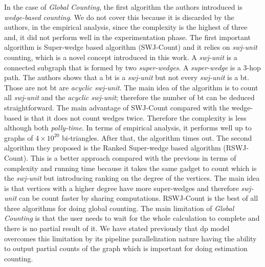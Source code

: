 In the case of \emph{Global Counting}, the first algorithm the authors introduced is \emph{wedge-based counting}. We do not cover this because it is discarded
by the authors, in the empirical analysis, since the complexity is the highest of three and, it did not perform well in the experimentation phase.
The first important algorithm is Super-wedge based algorithm (SWJ-Count) and it relies on \emph{swj-unit} counting, which is a novel concept introduced in this work. A \emph{swj-unit} is a connected subgraph that is formed by two \emph{super-wedges}. A \emph{super-wedge}
is a 3-hop path. The authors shows that a \acrshort{bt} is a \emph{swj-unit} but not every \emph{swj-unit} is a \acrshort{bt}. Those 
are not \acrshort{bt} are \emph{acyclic swj-unit}. The main idea of the algorithm is to count all \emph{swj-unit} and the \emph{acyclic swj-unit}; therefore
the number of \acrshort{bt} can be deduced straightforward.
The main advantage of SWJ-Count compared with the wedge-based is that it does not count wedges twice.
Therefore the complexity is less although both \emph{polly-time}.
In terms of empirical analysis, it performs well up to graphs of $4 \times 10^20$ bi-triangles. After that, the algorithm times out.
The second algorithm they proposed is the Ranked Super-wedge based algorithm (RSWJ-Count). This is a better approach compared with the previous in terms of complexity and running time because it takes the same gadget to count which is the \emph{swj-unit} but introducing ranking on the degree of the vertices. The main idea is that vertices with a higher degree have more super-wedges 
and therefore \emph{swj-unit} can be count faster by sharing computations. RSWJ-Count is the best of all three algorithms for doing global counting.
The main limitation of \emph{Global Counting} is that the user needs to wait for the whole calculation to complete and there is no partial result of it.
We have stated previously that \acrshort{dp} model overcomes this limitation by its pipeline parallelization nature having the ability to output partial counts of the graph which is important for doing estimation counting.


